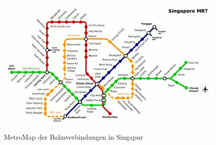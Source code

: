 \begin{figure}[t]
	\centering
	{\includegraphics[scale=0.5]{bilder/metromapsinga}\label{fig_metromapsinga}
	}\\
	\caption[MetroMap der Bahnverbindungen in Singapur]{MetroMap der Bahnverbindungen in Singapur}
	\label{fig_metromapsinga2}
\end{figure}